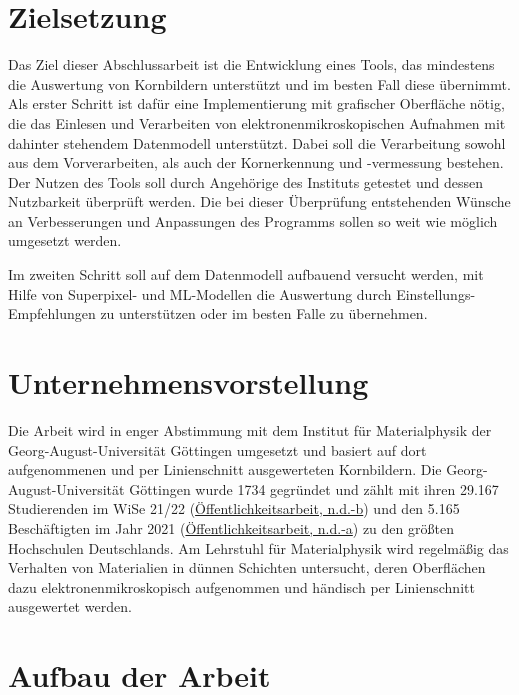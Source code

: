 \documentclass[
  12pt,
]{book}
\begin{document}
\hypertarget{zielsetzung}{%
\section{Zielsetzung}\label{zielsetzung}}

Das Ziel dieser Abschlussarbeit ist die Entwicklung eines Tools, das mindestens die Auswertung von Kornbildern unterstützt und im besten Fall diese übernimmt.
Als erster Schritt ist dafür eine Implementierung mit grafischer Oberfläche nötig, die das Einlesen und Verarbeiten von elektronenmikroskopischen Aufnahmen mit dahinter stehendem Datenmodell unterstützt.
Dabei soll die Verarbeitung sowohl aus dem Vorverarbeiten, als auch der Kornerkennung und -vermessung bestehen.
Der Nutzen des Tools soll durch Angehörige des Instituts getestet und dessen Nutzbarkeit überprüft werden. Die bei dieser Überprüfung entstehenden Wünsche an Verbesserungen und Anpassungen des Programms sollen so weit wie möglich umgesetzt werden.

Im zweiten Schritt soll auf dem Datenmodell aufbauend versucht werden, mit Hilfe von Superpixel- und ML-Modellen die Auswertung durch Einstellungs-Empfehlungen zu unterstützen oder im besten Falle zu übernehmen.

\hypertarget{unternehmensvorstellung}{%
\section{Unternehmensvorstellung}\label{unternehmensvorstellung}}

Die Arbeit wird in enger Abstimmung mit dem Institut für Materialphysik der Georg-August-Universität Göttingen umgesetzt und basiert auf dort aufgenommenen und per Linienschnitt ausgewerteten Kornbildern.
Die Georg-August-Universität Göttingen wurde 1734 gegründet und zählt mit ihren 29.167 Studierenden im WiSe 21/22 (\protect\hyperlink{ref-offentlichkeitsarbeitStudiumUndLehre}{Öffentlichkeitsarbeit, n.d.-b}) und den 5.165 Beschäftigten im Jahr 2021 (\protect\hyperlink{ref-offentlichkeitsarbeitPersonalGeorgAugustUniversitatGottingen}{Öffentlichkeitsarbeit, n.d.-a}) zu den größten Hochschulen Deutschlands. Am Lehrstuhl für Materialphysik wird regelmäßig das Verhalten von Materialien in dünnen Schichten untersucht, deren Oberflächen dazu elektronenmikroskopisch aufgenommen und händisch per Linienschnitt ausgewertet werden.

\hypertarget{aufbau-der-arbeit}{%
\section{Aufbau der Arbeit}\label{aufbau-der-arbeit}}
\end{document}
